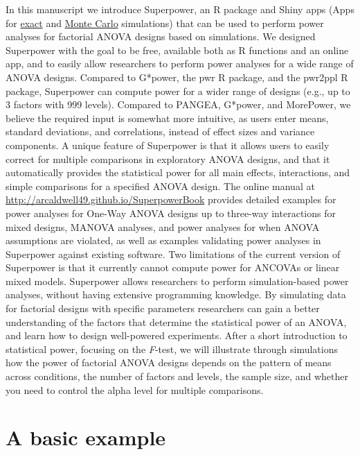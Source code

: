 \documentclass[
  english,
  ,jou,floatsintext]{apa6}
\begin{document}
In this manuscript we introduce Superpower, an R package and Shiny apps (Apps for \href{https://arcstats.io/shiny/anova-exact/}{exact} and \href{https://arcstats.io/shiny/anova-power/}{Monte Carlo} simulations) that can be used to perform power analyses for factorial ANOVA designs based on simulations.
We designed Superpower with the goal to be free, available both as R functions and an online app, and to easily allow researchers to perform power analyses for a wide range of ANOVA designs.
Compared to G*power, the pwr R package, and the pwr2ppl R package, Superpower can compute power for a wider range of designs (e.g., up to 3 factors with 999 levels).
Compared to PANGEA, G*power, and MorePower, we believe the required input is somewhat more intuitive, as users enter means, standard deviations, and correlations, instead of effect sizes and variance components.
A unique feature of Superpower is that it allows users to easily correct for multiple comparisons in exploratory ANOVA designs, and that it automatically provides the statistical power for all main effects, interactions, and simple comparisons for a specified ANOVA design.
The online manual at \url{http://arcaldwell49.github.io/SuperpowerBook} provides detailed examples for power analyses for One-Way ANOVA designs up to three-way interactions for mixed designs, MANOVA analyses, and power analyses for when ANOVA assumptions are violated, as well as examples validating power analyses in Superpower against existing software.
Two limitations of the current version of Superpower is that it currently cannot compute power for ANCOVAs or linear mixed models.
Superpower allows researchers to perform simulation-based power analyses, without having extensive programming knowledge.
By simulating data for factorial designs with specific parameters researchers can gain a better understanding of the factors that determine the statistical power of an ANOVA, and learn how to design well-powered experiments.
After a short introduction to statistical power, focusing on the \emph{F}-test, we will illustrate through simulations how the power of factorial ANOVA designs depends on the pattern of means across conditions, the number of factors and levels, the sample size, and whether you need to control the alpha level for multiple comparisons.

\hypertarget{a-basic-example}{%
\section{A basic example}\label{a-basic-example}}
\end{document}
